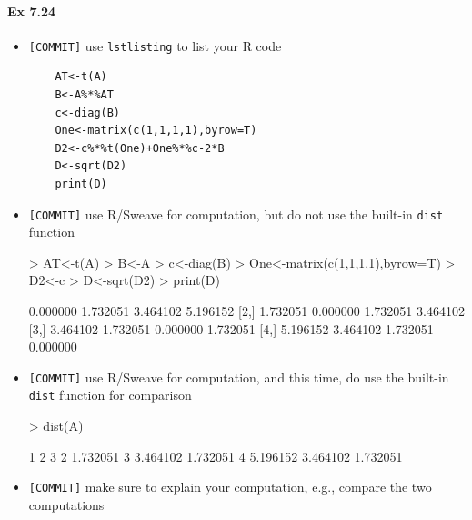 \documentclass[12pt]{article}
\begin{document}
\paragraph{Ex 7.24}
\begin{itemize}
    \item \verb+[COMMIT]+ use \verb+lstlisting+ to list your R code
    \begin{lstlisting}
    AT<-t(A)
    B<-A%*%AT
    c<-diag(B)
    One<-matrix(c(1,1,1,1),byrow=T)
    D2<-c%*%t(One)+One%*%c-2*B
    D<-sqrt(D2)
    print(D)
    \end{lstlisting}    
    
    \item \verb+[COMMIT]+ use R/Sweave for computation, but do not use the built-in \verb+dist+
        function
\begin{Schunk}
\begin{Sinput}
> AT<-t(A)
> B<-A%
> c<-diag(B)
> One<-matrix(c(1,1,1,1),byrow=T)
> D2<-c%
> D<-sqrt(D2)
> print(D)
\end{Sinput}
\begin{Soutput}
         [,1]     [,2]     [,3]     [,4]
[1,] 0.000000 1.732051 3.464102 5.196152
[2,] 1.732051 0.000000 1.732051 3.464102
[3,] 3.464102 1.732051 0.000000 1.732051
[4,] 5.196152 3.464102 1.732051 0.000000
\end{Soutput}
\end{Schunk}

    \item \verb+[COMMIT]+ use R/Sweave for computation, and this time, do use the built-in \verb+dist+
        function for comparison
\begin{Schunk}
\begin{Sinput}
> dist(A)
\end{Sinput}
\begin{Soutput}
         1        2        3
2 1.732051                  
3 3.464102 1.732051         
4 5.196152 3.464102 1.732051
\end{Soutput}
\end{Schunk}
    \item \verb+[COMMIT]+ make sure to explain your computation, e.g., compare the two
        computations
\end{itemize}
\end{document}
